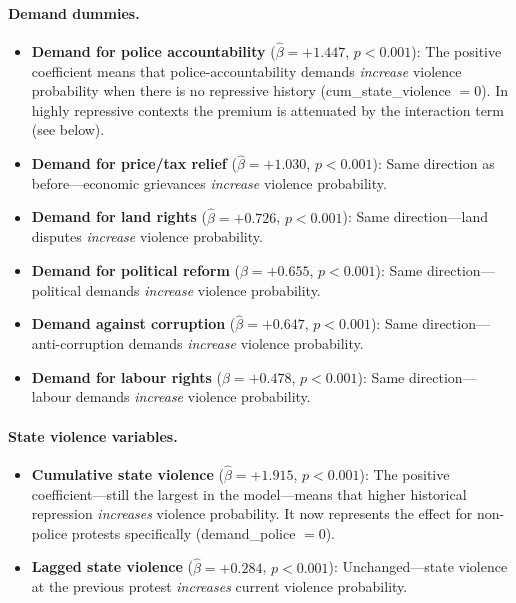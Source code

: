 \documentclass[12pt,a4paper]{article}
\begin{document}
\paragraph{Demand dummies.}
\begin{itemize}
  \item \textbf{Demand for police accountability} ($\hat{\beta} = +1.447$, $p < 0.001$): The positive coefficient means that police-accountability demands \emph{increase} violence probability when there is no repressive history (cum\_state\_violence $= 0$). In highly repressive contexts the premium is attenuated by the interaction term (see below).
  \item \textbf{Demand for price/tax relief} ($\hat{\beta} = +1.030$, $p < 0.001$): Same direction as before---economic grievances \emph{increase} violence probability.
  \item \textbf{Demand for land rights} ($\hat{\beta} = +0.726$, $p < 0.001$): Same direction---land disputes \emph{increase} violence probability.
  \item \textbf{Demand for political reform} ($\hat{\beta} = +0.655$, $p < 0.001$): Same direction---political demands \emph{increase} violence probability.
  \item \textbf{Demand against corruption} ($\hat{\beta} = +0.647$, $p < 0.001$): Same direction---anti-corruption demands \emph{increase} violence probability.
  \item \textbf{Demand for labour rights} ($\hat{\beta} = +0.478$, $p < 0.001$): Same direction---labour demands \emph{increase} violence probability.
\end{itemize}

\paragraph{State violence variables.}
\begin{itemize}
  \item \textbf{Cumulative state violence} ($\hat{\beta} = +1.915$, $p < 0.001$): The positive coefficient---still the largest in the model---means that higher historical repression \emph{increases} violence probability. It now represents the effect for non-police protests specifically (demand\_police $= 0$).
  \item \textbf{Lagged state violence} ($\hat{\beta} = +0.284$, $p < 0.001$): Unchanged---state violence at the previous protest \emph{increases} current violence probability.
\end{itemize}
\end{document}
